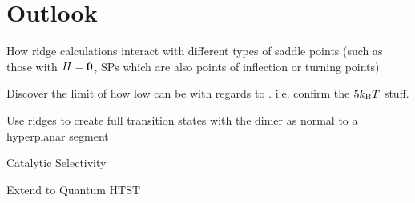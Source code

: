 \section{Outlook}
\label{sec:summary-outlook}

\bit
\item How ridge calculations interact with different types of saddle points (such as those with $H = {\mathrm{\mathbf{\bm{0}}}}$, SPs which are also points of inflection or turning points)
\item Discover the limit of how low  can be with regards to . i.e. confirm the $5k_\text{B} T$ stuff.
\item Use ridges to create full transition states with the dimer as normal to a hyperplanar segment
\item Catalytic Selectivity
\item Extend to Quantum HTST
\eit

\placeholder
